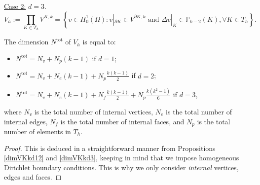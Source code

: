 \noindent \underline{Case 2:} $d=3$.
$$
V_h := \prod_{K\in T_h} V^{K,k} = \left\{v\in H^1_0(\Omega): v|_{\partial K} \in V^{\partial K, k} \text{ and } \Delta v|_K \in \mathbb{P}_{k-2}(K), \forall K\in T_h \right\}.
$$

\begin{proposition}
The dimension $N^\text{tot}$ of $V_h$ is equal to:
\begin{itemize}
\item $N^\text{tot} = N_v + N_p(k-1)$ if $d=1$;
\item $N^\text{tot} = N_v + N_e(k-1) + N_p\frac{k(k-1)}{2}$ if $d=2$;
\item $N^\text{tot} = N_v + N_e(k-1) + N_f\frac{k(k-1)}{2} + N_p\frac{k(k^2-1)}{6}$ if $d=3$, 
\end{itemize}
where $N_v$ is the total number of internal vertices, $N_e$ is the total number of internal edges, $N_f$ is the total number of internal faces, and $N_p$ is the total number of elements in $T_h$. 
\end{proposition}

\begin{proof}
This is deduced in a straightforward manner from Propositions \ref{dimVKkd12} and \ref{dimVKkd3}, keeping in mind that we impose homogeneous Dirichlet boundary conditions. This is why we only consider \emph{internal} vertices, edges and faces. 
\end{proof}

